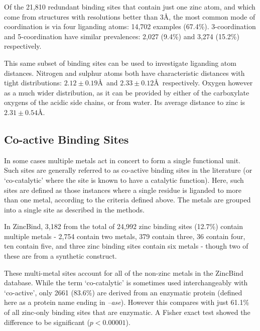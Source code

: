 Of the 21,810 redundant binding sites that contain just one zinc atom, and which come from structures with resolutions better than 3\AA, the most common mode of coordination is via four liganding atoms: 14,702 examples (67.4\%). 3-coordination and 5-coordination have similar prevalences: 2,027 (9.4\%) and 3,274 (15.2\%) respectively. 

This same subset of binding sites can be used to investigate liganding atom distances. Nitrogen and sulphur atoms both have characteristic distances with tight distributions: $2.12\pm0.19$\AA\ and $2.33\pm0.12$\AA\ respectively. Oxygen however as a much wider distribution, as it can be provided by either of the carboxylate oxygens of the acidic side chains, or from water. Its average distance to zinc is $2.31\pm0.54$\AA.

\subsection{Co-active Binding Sites}

In some cases multiple metals act in concert to form a single functional unit. Such sites are generally referred to as co-active binding sites in the literature (or `co-catalytic' where the site is known to have a catalytic function). Here, such sites are defined as those instances where a single residue is liganded to more than one metal, according to the criteria defined above. The metals are grouped into a single site as described in the methods.

In ZincBind, 3,182 from the total of 24,992 zinc binding sites (12.7\%) contain multiple metals - 2,754 contain two metals, 379 contain three, 36 contain four, ten contain five, and three zinc binding sites contain six metals - though two of these are from a synthetic construct.

These multi-metal sites account for all of the non-zinc metals in the ZincBind database. While the term `co-catalytic' is sometimes used interchangeably with `co-active', only 2661 (83.6\%) are derived from an enzymatic protein (defined here as a protein name ending in \emph{--ase}). However this compares with just 61.1\% of all zinc-only binding sites that are enzymatic. A Fisher exact test showed the difference to be significant ($p<0.00001$).